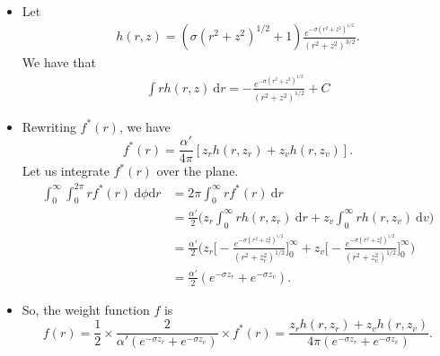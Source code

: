 \documentclass[10pt]{article}
\newcommand{\dee}{\mathrm{d}}
\begin{document}
\begin{itemize}
	\item Let 
		\begin{align*}
			h(r,z) = (\sigma (r^2 + z^2)^{1/2} + 1) 
			\frac{
				e^{-\sigma (r^2+z^2)^{1/2}}
			}
			{(r^2 + z^2)^{3/2}}.		
		\end{align*}
		We have that 
		\begin{align*}
			\int r h(r,z)\ \dee r = -\frac{
				e^{-\sigma (r^2+z^2)^{1/2}}}
				{(r^2 + z^2)^{1/2}} + C
		\end{align*}
	
	\item Rewriting $f^*(r)$, we have
		$$f^*(r) = \frac{\alpha'}{4\pi}[ z_r h(r, z_r) + z_v h(r, z_v) ].$$			Let us integrate $f^*(r)$ over the plane.
		\begin{align*}
			\int_0^\infty \int_0^{2\pi} rf^*(r)\ \dee\phi \dee r
			&= 2\pi \int_0^\infty rf^*(r)\ \dee r\\
			&= \frac{\alpha'}{2} 
				\bigg( 
				z_r \int_0^\infty r h(r, z_r) \ \dee r +
				z_v \int_0^\infty r h(r, z_v) \ \dee v
				\bigg)\\
			&= \frac{\alpha'}{2} \bigg( 
				z_r \bigg[ -\frac{e^{-\sigma (r^2+z_r^2)^{1/2}}}
				{(r^2 + z_r^2)^{1/2}} \bigg]_0^\infty 
				+ z_v \bigg[ -\frac{e^{-\sigma (r^2+z_v^2)^{1/2}}}
				{(r^2 + z_v^2)^{1/2}} \bigg]_0^\infty \bigg)\\
			&= \frac{\alpha'}{2}(e^{-\sigma z_r} + e^{-\sigma z_v}).			
		\end{align*}
		
	\item So, the weight function $f$ is 
		$$f(r) 
		= \frac{1}{2} \times \frac{2}{\alpha'(e^{-\sigma z_r} + e^{-\sigma z_v})} \times f^*(r)
		= \frac{z_r h(r,z_r) + z_v h(r,z_v)}{4\pi(e^{-\sigma z_r} + e^{-\sigma z_v})}.$$
	

\end{itemize}
\end{document}
